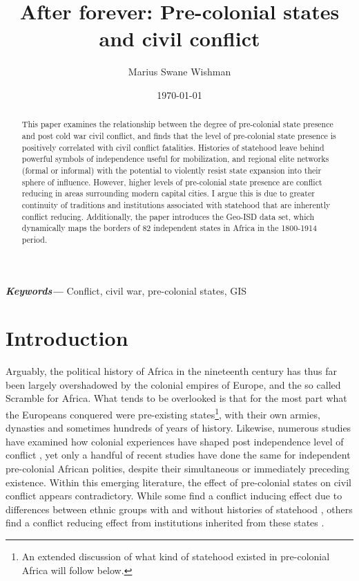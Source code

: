 \documentclass[12pt]{article}
\title{After forever: Pre-colonial states and civil conflict}
\author[1]{Marius Swane Wishman}
\affil[1]{Department of Sociology and Political Science, NTNU}
\date{\today}
\providecommand{\keywords}[1]
{
	\small	
	\textbf{\textit{Keywords---}} #1
}
\begin{document}
\maketitle

\begin{abstract}

This paper examines the relationship between the degree of pre-colonial state
presence and post cold war civil conflict, and finds that the level of
pre-colonial state presence is positively correlated with civil conflict
fatalities. Histories of statehood leave behind powerful symbols of independence
useful for mobilization, and regional elite networks (formal or informal) with
the potential to violently resist state expansion into their sphere of
influence. However, higher levels of pre-colonial state presence are conflict
reducing in areas surrounding modern capital cities. I argue this is due to
greater continuity of traditions and institutions associated with statehood that
are inherently conflict reducing. Additionally, the paper introduces the Geo-ISD
data set, which dynamically maps the borders of 82 independent states in Africa
in the 1800-1914 period. 

\end{abstract}

\keywords{Conflict, civil war, pre-colonial states, GIS}


\onehalfspacing


\newpage

\section{Introduction}

Arguably, the political history of Africa in the nineteenth century has thus far
been largely overshadowed by the colonial empires of Europe, and the so called
Scramble for Africa. What tends to be overlooked is that for the most part what
the Europeans conquered were pre-existing states\footnote{An extended discussion
of what kind of statehood existed in pre-colonial Africa will follow below.},
with their own armies, dynasties and sometimes hundreds of years of history.
Likewise, numerous studies have examined how colonial experiences have shaped
post independence level of conflict \citep{achankeng2013conflict, Blanton_2001,
carton2000blood, Cohen_2014, Nunn2008, Wucherpfennig2016}, yet only a handful of
recent studies have done the same for independent pre-colonial African polities,
despite their simultaneous or immediately preceding existence. Within this
emerging literature, the effect of pre-colonial states on civil conflict appears
contradictory. While some find a conflict inducing effect due to differences
between ethnic groups with and without histories of statehood
\citep{Englebert2002, Paine2019}, others find a conflict reducing effect from
institutions inherited from these states \citep{Depetris-Chauvin2016, Wig2016}.
\end{document}
